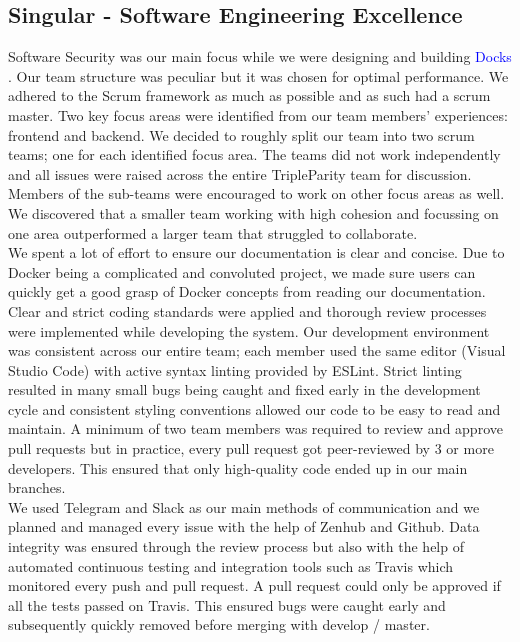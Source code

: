 \documentclass[]{article}
\newcommand{\docks}{\textcolor{Blue}{Docks} }
\newcommand{\docker}{Docker }
\begin{document}
\subsection{Singular - Software Engineering Excellence}
Software Security was our main focus while we were designing and building \docks.
Our team structure was peculiar but it was chosen for optimal performance. We adhered to the Scrum 
framework as much as possible and as such had a scrum master. Two key focus areas were identified from our team members' experiences: frontend and backend. We decided to roughly split our team into two scrum teams; one for each identified focus area. The teams did not work independently and all issues were raised across the entire TripleParity team for discussion. Members of the sub-teams were encouraged to work on other focus areas as well. We discovered that a smaller team working with high cohesion and focussing on one area outperformed a larger team that struggled to collaborate. \\

We spent a lot of effort to ensure our documentation is clear and concise. Due to \docker being a complicated and convoluted project, we made sure users can quickly get a good grasp of \docker concepts from reading our documentation. Clear and strict coding standards were applied and thorough review processes were implemented while developing the system. Our development environment was consistent across our entire team; each member used the same editor (Visual Studio Code) with active syntax linting provided by ESLint. Strict linting resulted in many small bugs being caught and fixed early in the development cycle and consistent styling conventions allowed our code to be easy to read and maintain. A minimum of two team members was required to review and approve pull requests but in practice, every pull request got peer-reviewed by 3 or more developers. This ensured that only high-quality code ended up in our main branches. \\

We used Telegram and Slack as our main methods of communication and we planned and
managed every issue with the help of Zenhub and Github. Data integrity was ensured through the review process but also with the help of automated continuous testing and integration tools such as  Travis which monitored every push and pull request. A pull request could only be approved if all the tests passed on Travis. This ensured bugs were caught early and subsequently quickly removed before merging with develop / master.
\end{document}
